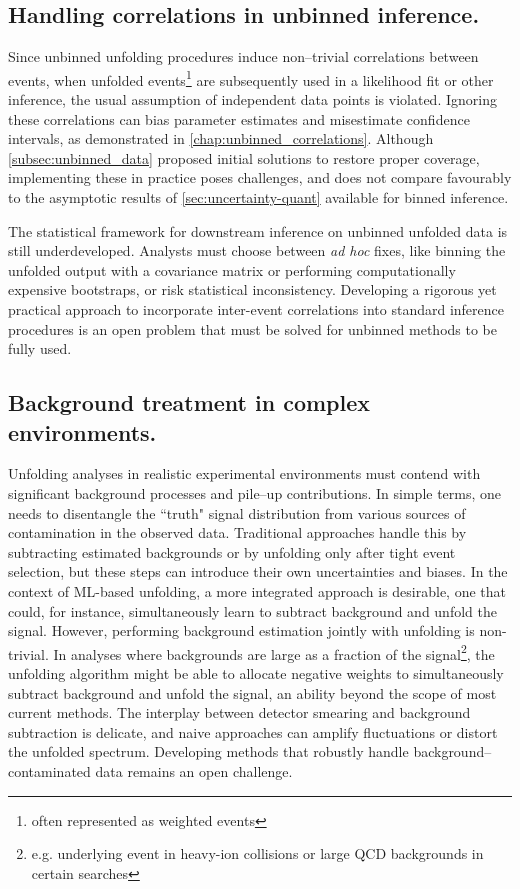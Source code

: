     \subsection{Handling correlations in unbinned inference.}
        Since unbinned unfolding procedures induce non--trivial correlations between events, when unfolded events\footnote{often represented as weighted events} are subsequently used in a likelihood fit or other inference, the usual assumption of independent data points is violated.
        Ignoring these correlations can bias parameter estimates and misestimate confidence intervals, as demonstrated in \cref{chap:unbinned_correlations}.
        Although \cref{subsec:unbinned_data} proposed initial solutions to restore proper coverage, implementing these in practice poses challenges, and does not compare favourably to the asymptotic results of \cref{sec:uncertainty-quant} available for binned inference.
        
        The statistical framework for downstream inference on unbinned unfolded data is still underdeveloped.
        Analysts must choose between \textit{ad hoc} fixes, like binning the unfolded output with a covariance matrix or performing computationally expensive bootstraps, or risk statistical inconsistency.
        Developing a rigorous yet practical approach to incorporate inter-event correlations into standard inference procedures is an open problem that must be solved for unbinned methods to be fully used.
    \subsection{Background treatment in complex environments.}
        Unfolding analyses in realistic experimental environments must contend with significant background processes and pile--up contributions.
        In simple terms, one needs to disentangle the ``truth" signal distribution from various sources of contamination in the observed data.
        Traditional approaches handle this by subtracting estimated backgrounds or by unfolding only after tight event selection, but these steps can introduce their own uncertainties and biases.
        In the context of ML-based unfolding, a more integrated approach is desirable, one that could, for instance, simultaneously learn to subtract background and unfold the signal.
        However, performing background estimation jointly with unfolding is non-trivial.
        In analyses where backgrounds are large as a fraction of the signal\footnote{e.g. underlying event in heavy-ion collisions or large QCD backgrounds in certain searches}, the unfolding algorithm might be able to allocate negative weights to simultaneously subtract background and unfold the signal, an ability beyond the scope of most current methods.
        The interplay between detector smearing and background subtraction is delicate, and naive approaches can amplify fluctuations or distort the unfolded spectrum.
        Developing methods that robustly handle background--contaminated data remains an open challenge.
